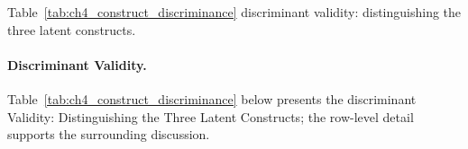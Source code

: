 \noindent Table~\ref{tab:ch4_construct_discriminance} discriminant validity: distinguishing the three latent constructs.

\paragraph{Discriminant Validity.}


\noindent Table~\ref{tab:ch4_construct_discriminance} below presents the discriminant Validity: Distinguishing the Three Latent Constructs; the row-level detail supports the surrounding discussion.

